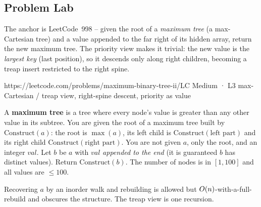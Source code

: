 \subsection{Problem Lab}

The anchor is LeetCode~998 -- given the root of a \emph{maximum tree} (a max-Cartesian tree) and a value
appended to the far right of its hidden array, return the new maximum tree. The priority view makes it
trivial: the new value is the \emph{largest key} (last position), so it descends only along right
children, becoming a treap insert restricted to the right spine.

  {https://leetcode.com/problems/maximum-binary-tree-ii/}{LC Medium · L3}
  {max-Cartesian / treap view, right-spine descent, priority as value}

\begin{problemstatement}
A \textbf{maximum tree} is a tree where every node's value is greater than any other value in its
subtree. You are given the root of a maximum tree built by $\text{Construct}(a)$: the root is
$\max(a)$, its left child is $\text{Construct}(\text{left part})$ and its right child
$\text{Construct}(\text{right part})$. You are not given $a$, only the root, and an integer $\mathit{val}$.
Let $b$ be $a$ with $\mathit{val}$ \emph{appended to the end} (it is guaranteed $b$ has distinct values).
Return $\text{Construct}(b)$. The number of nodes is in $[1,100]$ and all values are $\le 100$.
\end{problemstatement}

\begin{attemptgate}
Recovering $a$ by an inorder walk and rebuilding is allowed but $O(n)$-with-a-full-rebuild and
obscures the structure. The treap view is one recursion.
\end{attemptgate}

